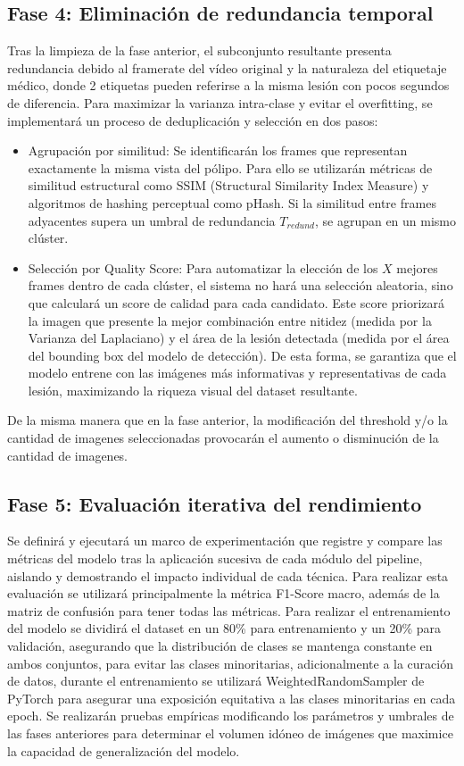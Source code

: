 ﻿\documentclass[10pt,a4paper,twocolumn,twoside]{article}
\begin{document}
\subsection{Fase 4: Eliminación de redundancia temporal}
Tras la limpieza de la fase anterior, el subconjunto resultante presenta redundancia debido al framerate del vídeo original y la naturaleza del etiquetaje médico, donde 2 etiquetas pueden referirse a la misma lesión con pocos segundos de diferencia. Para maximizar la varianza intra-clase y evitar el overfitting, se implementará un proceso de deduplicación y selección en dos pasos:
\begin{itemize}
    \item Agrupación por similitud: Se identificarán los frames que representan exactamente la misma vista del pólipo. Para ello se utilizarán métricas de similitud estructural como SSIM (Structural Similarity Index Measure) y algoritmos de hashing perceptual como pHash. Si la similitud entre frames adyacentes supera un umbral de redundancia $T_{redund}$, se agrupan en un mismo clúster.
    \item Selección por Quality Score: Para automatizar la elección de los $X$ mejores frames dentro de cada clúster, el sistema no hará una selección aleatoria, sino que calculará un score de calidad para cada candidato. Este score priorizará la imagen que presente la mejor combinación entre nitidez (medida por la Varianza del Laplaciano) y el área de la lesión detectada (medida por el área del bounding box del modelo de detección). De esta forma, se garantiza que el modelo entrene con las imágenes más informativas y representativas de cada lesión, maximizando la riqueza visual del dataset resultante.
\end{itemize}
De la misma manera que en la fase anterior, la modificación del threshold y/o la cantidad de imagenes seleccionadas provocarán el aumento o disminución de la cantidad de imagenes.
\subsection{Fase 5: Evaluación iterativa del rendimiento}
Se definirá y ejecutará un marco de experimentación que registre y compare las métricas del modelo tras la aplicación sucesiva de cada módulo del pipeline, aislando y demostrando el impacto individual de cada técnica. Para realizar esta evaluación se utilizará principalmente la métrica F1-Score macro, además de la matriz de confusión para tener todas las métricas. Para realizar el entrenamiento del modelo se dividirá el dataset en un 80\% para entrenamiento y un 20\% para validación, asegurando que la distribución de clases se mantenga constante en ambos conjuntos, para evitar las clases minoritarias, adicionalmente a la curación de datos, durante el entrenamiento se utilizará WeightedRandomSampler de PyTorch para asegurar una exposición equitativa a las clases minoritarias en cada epoch. 
Se realizarán pruebas empíricas modificando los parámetros y umbrales de las fases anteriores para determinar el volumen idóneo de imágenes que maximice la capacidad de generalización del modelo.
\end{document}
